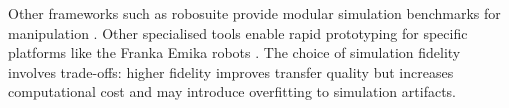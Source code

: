 \documentclass[12pt,a4paper,oneside]{report}
\begin{document}
Other frameworks such as robosuite provide modular simulation benchmarks for manipulation \cite{zhuRobosuiteModularSimulation2025}. Other specialised tools enable rapid prototyping for specific platforms like the Franka Emika robots \cite{alsaediDeepReinforcementLearning2023}. The choice of simulation fidelity involves trade-offs: higher fidelity improves transfer quality but increases computational cost and may introduce overfitting to simulation artifacts.






\end{document}
